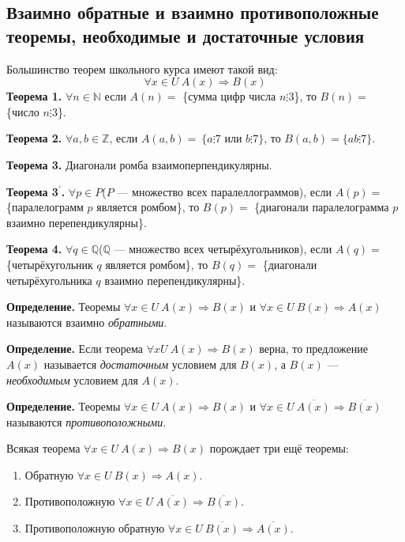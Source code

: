 \documentclass{article}
\begin{document}
    \subsection{Взаимно обратные и взаимно противоположные теоремы, необходимые и достаточные условия}

    Большинство теорем школьного курса имеют такой вид:
    \[\forall x \in U\ A(x) \Rightarrow B(x)\]
    \textbf{Теорема 1.} \(\forall n \in \mathbb{N}\) если \(A(n)=\) \{сумма цифр числа \(n \vdots 3\)\}, то \(B(n)=\) \{число \(n \vdots 3\)\}.

    \textbf{Теорема 2.} \(\forall a, b \in \mathbb{Z}\), если \(A(a,b)=\ \{a \vdots 7\) или \(b \vdots 7\}\), то \(B(a,b)=\{ab \vdots 7\}\).

    \textbf{Теорема 3.} Диагонали ромба взаимоперпендикулярны.

    \textbf{Теорема 3\(^\prime\).} \(\forall p \in P\)(\(P\) --- множество всех паралеллограммов), если \(A(p)=\) \{паралелограмм \(p\) является ромбом\}, то \(B(p)=\) \{диагонали паралелограмма \(p\) взаимно перепендикулярны\}.

    \textbf{Теорема 4.} \(\forall q \in \mathbb{Q}\)(\(\mathbb{Q}\) --- множество всех четырёхугольников), если \(A(q)=\) \{четырёхугольник \(q\) является ромбом\}, то \(B(q)=\) \{диагонали четырёхугольника \(q\) взаимно перепендикулярны\}.

    \textbf{Определение.} Теоремы \(\forall x \in U\ A(x) \Rightarrow B(x)\) и \(\forall x \in U\ B(x) \Rightarrow A(x)\) называются взаимно \textit{обратными}.

    \textbf{Определение.} Если теорема \(\forall x U\ A(x) \Rightarrow B(x)\) верна, то предложение \(A(x)\) называется \textit{достаточным} условием для \(B(x)\), а \(B(x)\) --- \textit{необходимым} условием для \(A(x)\).

    \textbf{Определение.} Теоремы \(\forall x \in U\ A(x) \Rightarrow B(x)\) и \(\forall x \in U\ \overline{A(x)} \Rightarrow \overline{B(x)}\) называются \textit{противоположными}.

    Всякая теорема \(\forall x \in U\ A(x) \Rightarrow B(x)\) порождает три ещё теоремы:
    \begin{enumerate}
        \item Обратную \(\forall x \in U\ B(x) \Rightarrow A(x)\).
        \item Противоположную \(\forall x \in U\ \overline{A(x)} \Rightarrow \overline{B(x)}\).
        \item Противоположную обратную \(\forall x \in U\ \overline{B(x)} \Rightarrow \overline{A(x)}\).
    \end{enumerate}
\end{document}

